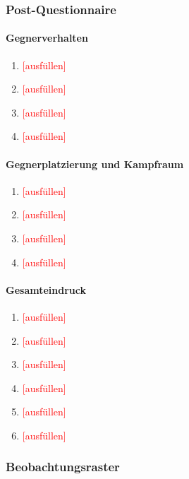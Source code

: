 \documentclass[../Main.tex]{subfiles}
\begin{document}
\subsubsection{Post-Questionnaire}

\paragraph{Gegnerverhalten}
\begin{enumerate}[label=\textbf{Q\arabic*}, leftmargin=1.5cm, itemsep=0.5em]
    \item \textcolor{red}{[ausfüllen]}
    \item \textcolor{red}{[ausfüllen]}
    \item \textcolor{red}{[ausfüllen]}
    \item \textcolor{red}{[ausfüllen]}
\end{enumerate}

\paragraph{Gegnerplatzierung und Kampfraum}
\begin{enumerate}[label=\textbf{Q\arabic*}, leftmargin=1.5cm, itemsep=0.5em, resume]
    \item \textcolor{red}{[ausfüllen]}
    \item \textcolor{red}{[ausfüllen]}
    \item \textcolor{red}{[ausfüllen]}
    \item \textcolor{red}{[ausfüllen]}
\end{enumerate}

\paragraph{Gesamteindruck}
\begin{enumerate}[label=\textbf{Q\arabic*}, leftmargin=1.5cm, itemsep=0.5em, resume]
    \item \textcolor{red}{[ausfüllen]}
    \item \textcolor{red}{[ausfüllen]}
    \item \textcolor{red}{[ausfüllen]}
    \item \textcolor{red}{[ausfüllen]}
    \item \textcolor{red}{[ausfüllen]}
    \item \textcolor{red}{[ausfüllen]}
\end{enumerate}

\subsubsection{Beobachtungsraster}
\end{document}
